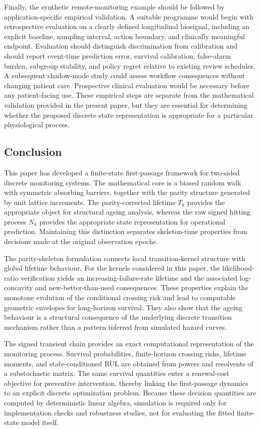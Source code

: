\documentclass[pdflatex,sn-mathphys-num]{sn-jnl}
\theoremstyle{definition}
\numberwithin{equation}{section}
\begin{document}
Finally, the synthetic remote-monitoring example should be followed by
application-specific empirical validation. A suitable programme would begin
with retrospective evaluation on a clearly defined longitudinal biosignal,
including an explicit baseline, sampling interval, action boundary, and
clinically meaningful endpoint. Evaluation should distinguish discrimination
from calibration and should report event-time prediction error, survival
calibration, false-alarm burden, subgroup stability, and policy regret relative
to existing review schedules. A subsequent shadow-mode study could assess
workflow consequences without changing patient care. Prospective clinical
evaluation would be necessary before any patient-facing use. These empirical
steps are separate from the mathematical validation provided in the present
paper, but they are essential for determining whether the proposed discrete
state representation is appropriate for a particular physiological process.

\subsection*{Conclusion}

This paper has developed a finite-state first-passage framework for two-sided
discrete monitoring systems. The mathematical core is a biased random walk with
symmetric absorbing barriers, together with the parity structure generated by
unit lattice increments. The parity-corrected lifetime \(T_k\) provides the
appropriate object for structural ageing analysis, whereas the raw signed
hitting process \(N_k\) provides the appropriate state representation for
operational prediction. Maintaining this distinction separates skeleton-time
properties from decisions made at the original observation epochs.

The parity-skeleton formulation connects local transition-kernel structure
with global lifetime behaviour. For the kernels considered in this paper, the
likelihood-ratio verification yields an increasing-failure-rate lifetime and
the associated log-concavity and new-better-than-used consequences. These
properties explain the monotone evolution of the conditional crossing risk and
lead to computable geometric envelopes for long-horizon survival. They also
show that the ageing behaviour is a structural consequence of the underlying
discrete transition mechanism rather than a pattern inferred from simulated
hazard curves.

The signed transient chain provides an exact computational representation of
the monitoring process. Survival probabilities, finite-horizon crossing risks,
lifetime moments, and state-conditioned RUL are obtained from powers and
resolvents of a substochastic matrix. The same survival quantities enter a
renewal-cost objective for preventive intervention, thereby linking the
first-passage dynamics to an explicit discrete optimization problem. Because
these decision quantities are computed by deterministic linear algebra,
simulation is required only for implementation checks and robustness studies,
not for evaluating the fitted finite-state model itself.
\end{document}
